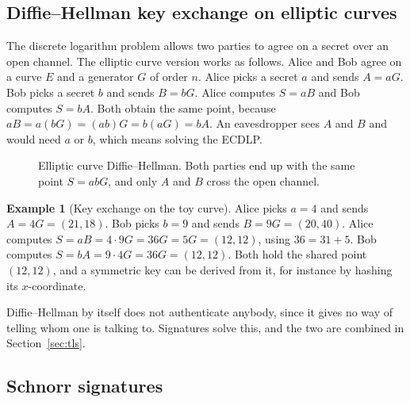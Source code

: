 \documentclass[11pt,a4paper]{article}
\theoremstyle{definition}
\newtheorem{example}[definition]{Example}
\begin{document}
\subsection{Diffie--Hellman key exchange on elliptic curves}

The discrete logarithm problem allows two parties to agree on a secret over an open channel. The elliptic curve version works as follows. Alice and Bob agree on a curve $E$ and a generator $G$ of order $n$. Alice picks a secret $a$ and sends $A=aG$. Bob picks a secret $b$ and sends $B=bG$. Alice computes $S=aB$ and Bob computes $S=bA$. Both obtain the same point, because $aB=a(bG)=(ab)G=b(aG)=bA$. An eavesdropper sees $A$ and $B$ and would need $a$ or $b$, which means solving the ECDLP.

\begin{figure}[h]
\centering
{}
\caption{Elliptic curve Diffie--Hellman. Both parties end up with the same point $S=abG$, and only $A$ and $B$ cross the open channel.}
\end{figure}

\begin{example}[Key exchange on the toy curve]\label{ex:ecdh}
Alice picks $a=4$ and sends $A=4G=(21,18)$. Bob picks $b=9$ and sends $B=9G=(20,40)$. Alice computes $S=aB=4\cdot 9G=36G=5G=(12,12)$, using $36=31+5$. Bob computes $S=bA=9\cdot 4G=36G=(12,12)$. Both hold the shared point $(12,12)$, and a symmetric key can be derived from it, for instance by hashing its $x$-coordinate.
\end{example}

Diffie--Hellman by itself does not authenticate anybody, since it gives no way of telling whom one is talking to. Signatures solve this, and the two are combined in Section~\ref{sec:tls}.


\subsection{Schnorr signatures}\label{sec:schnorr}
\end{document}
